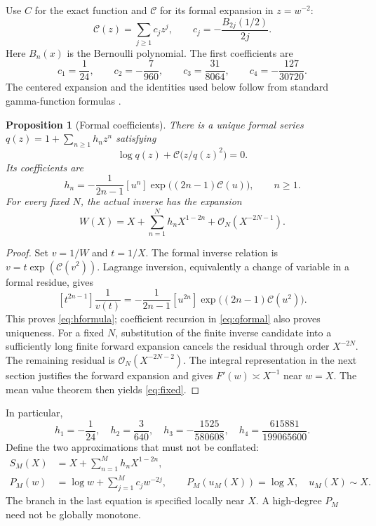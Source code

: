 \documentclass[11pt,a4paper]{article}
\newtheorem{proposition}[theorem]{Proposition}
\theoremstyle{definition}
\numberwithin{equation}{section}
\newcommand{\Oh}{\mathcal O}
\newcommand{\cF}{\mathcal C}
\newcommand{\coef}[2]{[#1^{#2}]}
\begin{document}
Use $C$ for the exact function and $\cF$ for its formal expansion in $z=w^{-2}$:
\begin{equation}
 \cF(z)=\sum_{j\ge1}c_jz^j,
 \qquad c_j=-\frac{B_{2j}(1/2)}{2j}.
 \label{eq:Cformal}
\end{equation}
Here $B_n(x)$ is the Bernoulli polynomial. The first coefficients are
\begin{equation}
 c_1=\frac1{24},\qquad c_2=-\frac7{960},\qquad
 c_3=\frac{31}{8064},\qquad c_4=-\frac{127}{30720}.
 \label{eq:cfirst}
\end{equation}
The centered expansion and the identities used below follow from standard gamma-function formulas \cite{dlmf}.

\begin{proposition}[Formal coefficients]
\label{prop:formal}
There is a unique formal series $q(z)=1+\sum_{n\ge1}h_nz^n$ satisfying
\begin{equation}
 \log q(z)+\cF\bigl(z/q(z)^2\bigr)=0.
 \label{eq:qformal}
\end{equation}
Its coefficients are
\begin{equation}
 h_n=-\frac1{2n-1}\coef{u}{n}
          \exp\bigl((2n-1)\cF(u)\bigr),\qquad n\ge1.
 \label{eq:hformula}
\end{equation}
For every fixed $N$, the actual inverse has the expansion
\begin{equation}
 W(X)=X+\sum_{n=1}^{N}h_nX^{1-2n}+\Oh_N(X^{-2N-1}).
 \label{eq:fixed}
\end{equation}
\end{proposition}
\begin{proof}
Set $v=1/W$ and $t=1/X$. The formal inverse relation is
$v=t\exp(\cF(v^2))$. Lagrange inversion, equivalently a change of variable in a formal residue, gives
\[
 \coef{t}{2n-1}\frac1{v(t)}
 =-\frac1{2n-1}\coef{u}{2n}
              \exp\bigl((2n-1)\cF(u^2)\bigr).
\]
This proves \eqref{eq:hformula}; coefficient recursion in \eqref{eq:qformal} also proves uniqueness. For a fixed $N$, substitution of the finite inverse candidate into a sufficiently long finite forward expansion cancels the residual through order $X^{-2N}$. The remaining residual is $\Oh_N(X^{-2N-2})$. The integral representation in the next section justifies the forward expansion and gives $F'(w)\asymp X^{-1}$ near $w=X$. The mean value theorem then yields \eqref{eq:fixed}.
\end{proof}

In particular,
\begin{equation}
 h_1=-\frac1{24},\quad h_2=\frac3{640},\quad
 h_3=-\frac{1525}{580608},\quad h_4=\frac{615881}{199065600}.
 \label{eq:hfirst}
\end{equation}
Define the two approximations that must not be conflated:
\begin{align}
 S_M(X)&=X+\sum_{n=1}^M h_nX^{1-2n},\label{eq:SM}\\
 P_M(w)&=\log w+\sum_{j=1}^Mc_jw^{-2j},
 \qquad P_M(u_M(X))=\log X,\quad u_M(X)\sim X.
 \label{eq:uM}
\end{align}
The branch in the last equation is specified locally near $X$. A high-degree $P_M$ need not be globally monotone.
\end{document}
